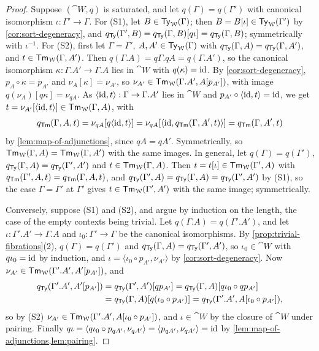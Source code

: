 \begin{proof}
    Suppose $(\cat{W}, q)$ is saturated, and let $q(\Gamma) = q(\Gamma')$ with canonical isomorphism $\iota : \Gamma' \to \Gamma$. For (S1), let $B \in \mathsf{Ty}_{\mathcal{W}}(\Gamma)$; then $B = B[\iota] \in \mathsf{Ty}_{\mathcal{W}}(\Gamma')$ by \cref{cor:sort-degeneracy}, and $q_{\mathsf{Ty}}(\Gamma', B) = q_{\mathsf{Ty}}(\Gamma, B)[q\iota] = q_{\mathsf{Ty}}(\Gamma, B)$; symmetrically with $\iota^{-1}$. For (S2), first let $\Gamma = \Gamma'$, $A, A' \in \mathsf{Ty}_{\mathcal{W}}(\Gamma)$ with $q_{\mathsf{Ty}}(\Gamma, A) = q_{\mathsf{Ty}}(\Gamma, A')$, and $t \in \mathsf{Tm}_{\mathcal{W}}(\Gamma, A')$. Then $q(\Gamma.A) = q\Gamma.qA = q(\Gamma.A')$, so the canonical isomorphism $\kappa : \Gamma.A' \to \Gamma.A$ lies in $\cat{W}$ with $q(\kappa) = \mathrm{id}$. By \cref{cor:sort-degeneracy}, $p_A \circ \kappa = p_{A'}$ and $\nu_A[\kappa] = \nu_{A'}$, so $\nu_{A'} \in \mathsf{Tm}_{\mathcal{W}}(\Gamma.A', A[p_{A'}])$, with image $q(\nu_A)[q\kappa] = \nu_{qA}$. As $\langle \mathrm{id}, t \rangle : \Gamma \to \Gamma.A'$ lies in $\cat{W}$ and $p_{A'} \circ \langle \mathrm{id}, t \rangle = \mathrm{id}$, we get $t = \nu_{A'}[\langle \mathrm{id}, t \rangle] \in \mathsf{Tm}_{\mathcal{W}}(\Gamma, A)$, with
    \[
        q_{\mathsf{Tm}}(\Gamma, A, t) = \nu_{qA}[q\langle \mathrm{id}, t \rangle] = \nu_{qA}[\langle \mathrm{id}, q_{\mathsf{Tm}}(\Gamma, A', t) \rangle] = q_{\mathsf{Tm}}(\Gamma, A', t)
    \]
    by \cref{lem:map-of-adjunctions}, since $qA = qA'$. Symmetrically, so $\mathsf{Tm}_{\mathcal{W}}(\Gamma, A) = \mathsf{Tm}_{\mathcal{W}}(\Gamma, A')$ with the same images. In general, let $q(\Gamma) = q(\Gamma')$, $q_{\mathsf{Ty}}(\Gamma, A) = q_{\mathsf{Ty}}(\Gamma', A')$ and $t \in \mathsf{Tm}_{\mathcal{W}}(\Gamma, A)$. Then $t = t[\iota] \in \mathsf{Tm}_{\mathcal{W}}(\Gamma', A)$ with $q_{\mathsf{Tm}}(\Gamma', A, t) = q_{\mathsf{Tm}}(\Gamma, A, t)$, and $q_{\mathsf{Ty}}(\Gamma', A) = q_{\mathsf{Ty}}(\Gamma, A) = q_{\mathsf{Ty}}(\Gamma', A')$ by (S1), so the case $\Gamma = \Gamma'$ at $\Gamma'$ gives $t \in \mathsf{Tm}_{\mathcal{W}}(\Gamma', A')$ with the same image; symmetrically.

    Conversely, suppose (S1) and (S2), and argue by induction on the length, the case of the empty contexts being trivial. Let $q(\Gamma.A) = q(\Gamma'.A')$, and let $\iota : \Gamma'.A' \to \Gamma.A$ and $\iota_0 : \Gamma' \to \Gamma$ be the canonical isomorphisms. By \cref{prop:trivial-fibrations}(2), $q(\Gamma) = q(\Gamma')$ and $q_{\mathsf{Ty}}(\Gamma, A) = q_{\mathsf{Ty}}(\Gamma', A')$, so $\iota_0 \in \cat{W}$ with $q\iota_0 = \mathrm{id}$ by induction, and $\iota = \langle \iota_0 \circ p_{A'}, \nu_{A'} \rangle$ by \cref{cor:sort-degeneracy}. Now $\nu_{A'} \in \mathsf{Tm}_{\mathcal{W}}(\Gamma'.A', A'[p_{A'}])$, and
    \begin{align*}
        q_{\mathsf{Ty}}(\Gamma'.A', A'[p_{A'}]) &= q_{\mathsf{Ty}}(\Gamma', A')[qp_{A'}] = q_{\mathsf{Ty}}(\Gamma, A)[q\iota_0 \circ qp_{A'}]\\
        &= q_{\mathsf{Ty}}(\Gamma, A)[q(\iota_0 \circ p_{A'})] = q_{\mathsf{Ty}}(\Gamma'.A', A[\iota_0 \circ p_{A'}]),
    \end{align*}
    so by (S2) $\nu_{A'} \in \mathsf{Tm}_{\mathcal{W}}(\Gamma'.A', A[\iota_0 \circ p_{A'}])$, and $\iota \in \cat{W}$ by the closure of $\cat{W}$ under pairing. Finally $q\iota = \langle q\iota_0 \circ p_{qA'}, \nu_{qA'} \rangle = \langle p_{qA'}, \nu_{qA'} \rangle = \mathrm{id}$ by \cref{lem:map-of-adjunctions,lem:pairing}.
\end{proof}

